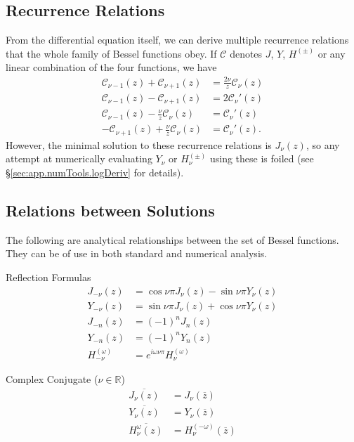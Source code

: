 \subsection{Recurrence Relations}
From the differential equation itself, we can derive multiple
recurrence relations that the whole family of Bessel functions 
obey. If $\mathcal{C}$ denotes $J$, $Y$, $H^{(\pm)}$ or any 
linear combination of the four functions, we have
  \begin{subequations}
   \label{eq:app.Bessel.recurrence}
  \begin{align}
   \mathcal{C}_{\nu-1}(z)+\mathcal{C}_{\nu+1}(z)		&= \frac{2\nu}{z}\mathcal{C}_\nu(z)	\label{eq:app.Bessel.recurrenceBessel}\\
   \mathcal{C}_{\nu-1}(z)-\mathcal{C}_{\nu+1}(z)		&= 2\mathcal{C}_\nu'(z)			\label{eq:app.Bessel.recurrenceDiffBessel}\\
   \mathcal{C}_{\nu-1}(z)-\frac{\nu}{z}\mathcal{C}_\nu(z)	&= \mathcal{C}_\nu'(z)			\\
   -\mathcal{C}_{\nu+1}(z)+\frac{\nu}{z}\mathcal{C}_\nu(z)	&= \mathcal{C}_\nu'(z).
  \end{align}
  \end{subequations}
However, the minimal solution to these recurrence relations is 
$J_\nu(z)$, so any attempt at numerically evaluating $Y_\nu$ or $H_\nu^{(\pm)}$
using these is foiled (see \S\ref{sec:app.numTools.logDeriv} for details). 

\subsection{Relations between Solutions}
The following are analytical relationships between the set of 
Bessel functions. They can be of use in both standard and numerical 
analysis. 

\begin{description}
 \item Reflection Formulas \cite[p.~286]{PRE2007}
  \begin{subequations}
  \begin{align}
   J_{-\nu}(z)	&= \cos\nu\pi J_\nu(z)-\sin\nu\pi Y_\nu(z)	\\
   Y_{-\nu}(z)	&= \sin\nu\pi J_\nu(z)+\cos\nu\pi Y_\nu(z)	\\
   J_{-n}(z)	&= (-1)^nJ_n(z)					\\
   Y_{-n}(z)	&= (-1)^nY_n(z)					\\
   H_{-\nu}^{(\omega)} &= e^{i\omega\nu\pi}H_\nu^{(\omega)}
  \end{align}
  \end{subequations}
 \item Complex Conjugate ($\nu\in\mathbb{R}$)
  \begin{subequations}
  \begin{align}
   \overline{J_\nu(z)}	&= J_\nu(\overline{z})	\\
   \overline{Y_\nu(z)}	&= Y_\nu(\overline{z})	\\
   \overline{H_\nu^{\omega}(z)} &= H_\nu^{(-\omega)}(\overline{z})\label{eq:app.Bessel.conjHankel}
  \end{align}
  \end{subequations}
\end{description}

